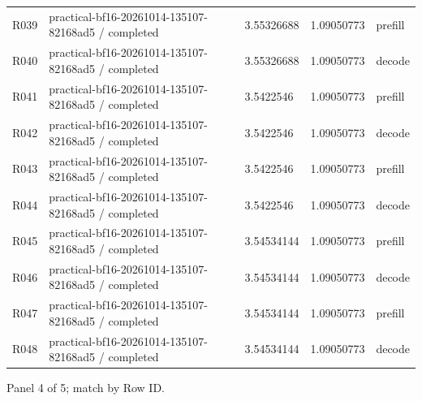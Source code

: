 \documentclass[10pt]{article}
\begin{document}
{\begin{longtable}{p{}p{}p{}p{}p{}}
R039 & practical-bf16-20261014-135107-82168ad5 / completed & 3.55326688 & 1.09050773 & prefill \\
R040 & practical-bf16-20261014-135107-82168ad5 / completed & 3.55326688 & 1.09050773 & decode \\
R041 & practical-bf16-20261014-135107-82168ad5 / completed & 3.5422546 & 1.09050773 & prefill \\
R042 & practical-bf16-20261014-135107-82168ad5 / completed & 3.5422546 & 1.09050773 & decode \\
R043 & practical-bf16-20261014-135107-82168ad5 / completed & 3.5422546 & 1.09050773 & prefill \\
R044 & practical-bf16-20261014-135107-82168ad5 / completed & 3.5422546 & 1.09050773 & decode \\
R045 & practical-bf16-20261014-135107-82168ad5 / completed & 3.54534144 & 1.09050773 & prefill \\
R046 & practical-bf16-20261014-135107-82168ad5 / completed & 3.54534144 & 1.09050773 & decode \\
R047 & practical-bf16-20261014-135107-82168ad5 / completed & 3.54534144 & 1.09050773 & prefill \\
R048 & practical-bf16-20261014-135107-82168ad5 / completed & 3.54534144 & 1.09050773 & decode \\
\end{longtable}}
\par\noindent Panel 4 of 5; match by Row ID.
\end{document}
